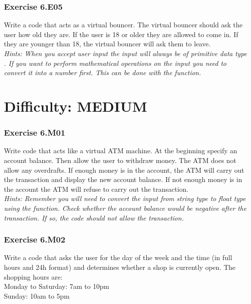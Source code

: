 
\subsubsection*{Exercise 6.E05}
Write a code that acts as a virtual bouncer. The virtual bouncer should ask the user how old
they are. If the user is 18 or older they are allowed to come in. If they are younger than 18,
the virtual bouncer will ask them to leave.\\


\textit{Hints:
When you accept user input the input will always be of primitive data type {}. If you want to perform mathematical operations on the input you need to convert it into a number
first. This can be done with the {} function.}



\newpage
\section{Difficulty: MEDIUM}


\subsubsection*{Exercise 6.M01}
Write code that acts like a virtual ATM machine. At the beginning specify an account
balance. Then allow the user to withdraw money. The ATM does not allow any overdrafts. If
enough money is in the account, the ATM will carry out the transaction and display the new
account balance. If not enough money is in the account the ATM will refuse to carry out the
transaction.\\


\textit{Hints:
Remember you will need to convert the input from string type to float type using the
{} function. Check whether the account balance would be negative after the transaction. If so, the code should not allow the transaction.}\\[1cm]



\subsubsection*{Exercise 6.M02}
Write a code that asks the user for the day of the week and the time (in full hours and 24h
format) and determines whether a shop is currently open. The shopping hours are:\\
\hspace*{5mm}Monday to Saturday: 7am to 10pm\\
\hspace*{5mm}Sunday: 10am to 5pm\\


